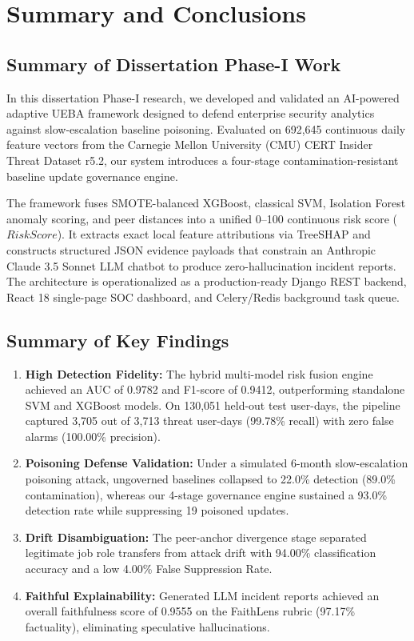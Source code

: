 \documentclass[12pt,a4paper]{report}
\begin{document}
\chapter{Summary and Conclusions}
\label{chap:conclusion}

\section{Summary of Dissertation Phase-I Work}
In this dissertation Phase-I research, we developed and validated an AI-powered adaptive UEBA framework designed to defend enterprise security analytics against slow-escalation baseline poisoning. Evaluated on 692,645 continuous daily feature vectors from the Carnegie Mellon University (CMU) CERT Insider Threat Dataset r5.2, our system introduces a four-stage contamination-resistant baseline update governance engine. 

The framework fuses SMOTE-balanced XGBoost, classical SVM, Isolation Forest anomaly scoring, and peer distances into a unified 0--100 continuous risk score ($RiskScore$). It extracts exact local feature attributions via TreeSHAP and constructs structured JSON evidence payloads that constrain an Anthropic Claude 3.5 Sonnet LLM chatbot to produce zero-hallucination incident reports. The architecture is operationalized as a production-ready Django REST backend, React 18 single-page SOC dashboard, and Celery/Redis background task queue.

\section{Summary of Key Findings}
\begin{enumerate}
    \item \textbf{High Detection Fidelity:} The hybrid multi-model risk fusion engine achieved an AUC of 0.9782 and F1-score of 0.9412, outperforming standalone SVM and XGBoost models. On 130,051 held-out test user-days, the pipeline captured 3,705 out of 3,713 threat user-days (99.78\% recall) with zero false alarms (100.00\% precision).
    \item \textbf{Poisoning Defense Validation:} Under a simulated 6-month slow-escalation poisoning attack, ungoverned baselines collapsed to 22.0\% detection (89.0\% contamination), whereas our 4-stage governance engine sustained a 93.0\% detection rate while suppressing 19 poisoned updates.
    \item \textbf{Drift Disambiguation:} The peer-anchor divergence stage separated legitimate job role transfers from attack drift with 94.00\% classification accuracy and a low 4.00\% False Suppression Rate.
    \item \textbf{Faithful Explainability:} Generated LLM incident reports achieved an overall faithfulness score of 0.9555 on the FaithLens rubric (97.17\% factuality), eliminating speculative hallucinations.
\end{enumerate}
\end{document}
